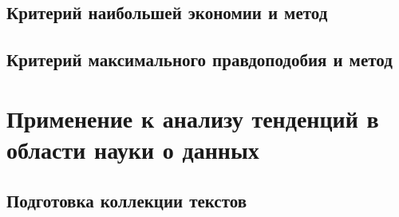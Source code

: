 \documentclass[12pt]{article}
\begin{document}
\subsection{Критерий наибольшей экономии и метод}
\subsection{Критерий максимального правдоподобия и метод}


\section{Применение к анализу тенденций в области науки о данных}

\subsection{Подготовка коллекции текстов}
\label{section:text-data}
\end{document}
